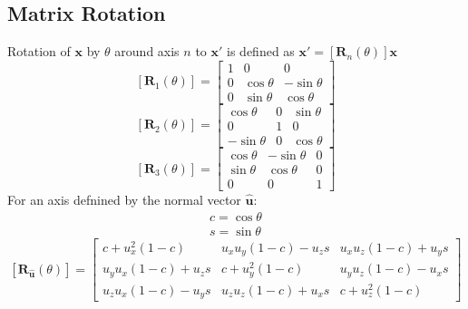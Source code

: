 \subsection{Matrix Rotation}
Rotation of $\mathbf{x}$ by $\theta$ around axis $n$ to $\mathbf{x}'$ is defined as
$\mathbf{x}' = \left[\mathbf{R}_n\left(\theta\right)\right]\mathbf{x}$
\begin{equation}
    \label{rotx}
    \left[\mathbf{R}_1\left(\theta\right)\right] =
    \begin{bmatrix}
        1 & 0            &  0            \\
        0 & \cos{\theta} & -\sin{\theta} \\
        0 & \sin{\theta} &  \cos{\theta}
    \end{bmatrix}
\end{equation}
\begin{equation}
    \label{roty}
    \left[\mathbf{R}_2\left(\theta\right)\right] =
    \begin{bmatrix}
         \cos{\theta} & 0 & \sin{\theta} \\
         0            & 1 & 0            \\
        -\sin{\theta} & 0 & \cos{\theta}
    \end{bmatrix}
\end{equation}
\begin{equation}
    \label{rotz}
    \left[\mathbf{R}_3\left(\theta\right)\right] =
    \begin{bmatrix}
        \cos{\theta} & -\sin{\theta} & 0 \\
        \sin{\theta} &  \cos{\theta} & 0 \\
        0            &  0            & 1
    \end{bmatrix}
\end{equation}
For an axis defnined by the normal vector $\hat{\mathbf{u}}$:
\[
    \begin{array}{c}
        c = \cos{\theta} \\
        s = \sin{\theta}
    \end{array}
\]
\begin{equation}
    \label{rotu}
    \left[\mathbf{R}_{\hat{\mathbf{u}}}\left(\theta\right)\right] =
    \begin{bmatrix}
        c+u_x^2\left(1-c\right)           & u_{x}u_{y}\left(1-c\right)-u_{z}s & u_{x}u_{z}\left(1-c\right)+u_{y}s \\
        u_{y}u_{x}\left(1-c\right)+u_{z}s & c+u_y^2\left(1-c\right)           & u_{y}u_{z}\left(1-c\right)-u_{x}s \\
        u_{z}u_{x}\left(1-c\right)-u_{y}s & u_{z}u_{z}\left(1-c\right)+u_{x}s & c + u_z^2\left(1 - c\right)
    \end{bmatrix}
\end{equation}

